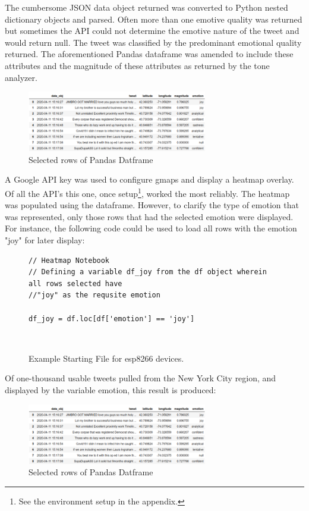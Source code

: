 \documentclass[12pt, oneside]{article}
\begin{document}
The cumbersome JSON data object returned was converted to Python nested
dictionary objects and parsed. Often more than one emotive quality was returned
but sometimes the API could not determine the emotive nature of the tweet and
would return null. The tweet was classified by the predominant emotional
quality returned. The aforementioned Pandas dataframe was amended to include
these attributes and the magnitude of these attributes as returned by the tone
analyzer.

\begin{figure}[H]
\centering
\includegraphics[width=0.7\textwidth]{dataframe}
  \caption{Selected rows of Pandas Datframe}
\end{figure}

A Google API key was used to configure gmaps and display a heatmap overlay. Of
all the API's this one, once setup\footnote{See the environment setup in the
appendix.}, worked the most reliably. The heatmap was populated using the
dataframe. However, to clarify the type of emotion that was represented, only
those rows that had the selected emotion were displayed. For instance, the
following code could be used to load all rows with the emotion "joy" for later
display:
\begin{figure}[H]
\begin{lstlisting}
// Heatmap Notebook
// Defining a variable df_joy from the df object wherein all rows selected have
//"joy" as the requsite emotion

df_joy = df.loc[df['emotion'] == 'joy']
\end{lstlisting}
\caption{Example Starting File for esp8266 devices.}\
\label{fig:code}
\end{figure}

Of one-thousand usable tweets pulled from the New York City region, and
displayed by the variable emotion, this result is produced:

\begin{figure}[H]
\centering
\includegraphics[width=0.7\textwidth]{dataframe}
  \caption{Selected rows of Pandas Datframe}
\end{figure}
\end{document}
